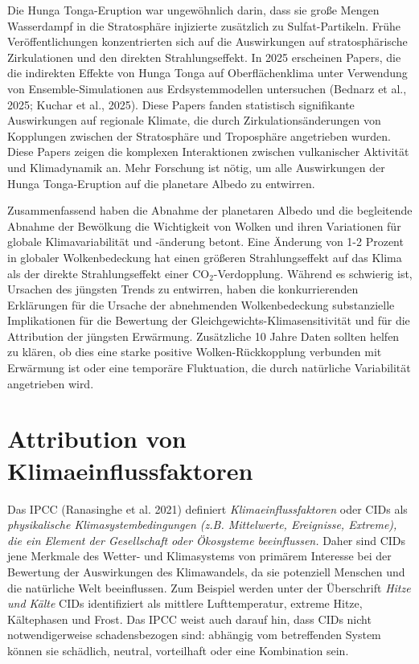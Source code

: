 \documentclass[12pt,paper=a4,DIV=12,parskip=never,chapterprefix=false,headings=standardclasses]{scrreprt}
\begin{document}
Die Hunga Tonga-Eruption war ungewöhnlich darin, dass sie große Mengen Wasserdampf in die Stratosphäre injizierte zusätzlich zu Sulfat-Partikeln. Frühe Veröffentlichungen konzentrierten sich auf die Auswirkungen auf stratosphärische Zirkulationen und den direkten Strahlungseffekt. In 2025 erscheinen Papers, die die indirekten Effekte von Hunga Tonga auf Oberflächenklima unter Verwendung von Ensemble-Simulationen aus Erdsystemmodellen untersuchen (Bednarz et al., 2025; Kuchar et al., 2025). Diese Papers fanden statistisch signifikante Auswirkungen auf regionale Klimate, die durch Zirkulationsänderungen von Kopplungen zwischen der Stratosphäre und Troposphäre angetrieben wurden. Diese Papers zeigen die komplexen Interaktionen zwischen vulkanischer Aktivität und Klimadynamik an. Mehr Forschung ist nötig, um alle Auswirkungen der Hunga Tonga-Eruption auf die planetare Albedo zu entwirren.

Zusammenfassend haben die Abnahme der planetaren Albedo und die begleitende Abnahme der Bewölkung die Wichtigkeit von Wolken und ihren Variationen für globale Klimavariabilität und -änderung betont. Eine Änderung von 1-2 Prozent in globaler Wolkenbedeckung hat einen größeren Strahlungseffekt auf das Klima als der direkte Strahlungseffekt einer CO$_2$-Verdopplung. Während es schwierig ist, Ursachen des jüngsten Trends zu entwirren, haben die konkurrierenden Erklärungen für die Ursache der abnehmenden Wolkenbedeckung substanzielle Implikationen für die Bewertung der Gleichgewichts-Klimasensitivität und für die Attribution der jüngsten Erwärmung. Zusätzliche 10 Jahre Daten sollten helfen zu klären, ob dies eine starke positive Wolken-Rückkopplung verbunden mit Erwärmung ist oder eine temporäre Fluktuation, die durch natürliche Variabilität angetrieben wird.

\section{Attribution von Klimaeinflussfaktoren}
Das IPCC (Ranasinghe et al. 2021) definiert \emph{Klimaeinflussfaktoren} oder CIDs als \emph{physikalische Klimasystembedingungen (z.B. Mittelwerte, Ereignisse, Extreme), die ein Element der Gesellschaft oder Ökosysteme beeinflussen.} Daher sind CIDs jene Merkmale des Wetter- und Klimasystems von primärem Interesse bei der Bewertung der Auswirkungen des Klimawandels, da sie potenziell Menschen und die natürliche Welt beeinflussen. Zum Beispiel werden unter der Überschrift \emph{Hitze und Kälte} CIDs identifiziert als mittlere Lufttemperatur, extreme Hitze, Kältephasen und Frost. Das IPCC weist auch darauf hin, dass CIDs nicht notwendigerweise schadensbezogen sind: abhängig vom betreffenden System können sie schädlich, neutral, vorteilhaft oder eine Kombination sein.
\end{document}
